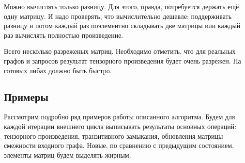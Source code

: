 Можно вычислять только разницу.
Для этого, правда, потребуется держать ещё одну матрицу.
И надо проверять, что вычислительно дешевле: поддерживать разницу и потом каждый раз поэлементно складывать две матрицы или каждый раз вычислять полностью произведение.

Всего несколько разреженых матриц.
Необходимо отметить, что для реальных графов и запросов результат тензорного произведения будет очень разрежен.
На готовых либах должно быть быстро.

\subsection{Примеры}

Рассмотрим подробно ряд примеров работы описанного алгоритма. 
Будем для каждой итерации внешнего цикла выписывать результаты основных операций: тензорного произведения, транзитивного замыкания, обновления матрицы смежности входного графа.
Новые, по сравнению с предыдущим состоянием, элементы матриц будем выделять жирным.

